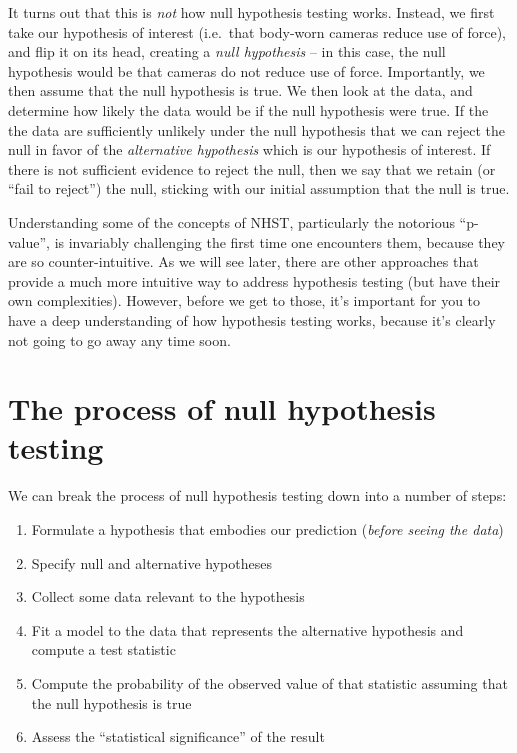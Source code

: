 \documentclass[
  12pt,
]{book}
\providecommand{\tightlist}{%
  \setlength{\itemsep}{0pt}\setlength{\parskip}{0pt}}
\begin{document}
It turns out that this is \emph{not} how null hypothesis testing works. Instead, we first take our hypothesis of interest (i.e.~that body-worn cameras reduce use of force), and flip it on its head, creating a \emph{null hypothesis} -- in this case, the null hypothesis would be that cameras do not reduce use of force. Importantly, we then assume that the null hypothesis is true. We then look at the data, and determine how likely the data would be if the null hypothesis were true. If the the data are sufficiently unlikely under the null hypothesis that we can reject the null in favor of the \emph{alternative hypothesis} which is our hypothesis of interest. If there is not sufficient evidence to reject the null, then we say that we retain (or ``fail to reject'') the null, sticking with our initial assumption that the null is true.

Understanding some of the concepts of NHST, particularly the notorious ``p-value'', is invariably challenging the first time one encounters them, because they are so counter-intuitive. As we will see later, there are other approaches that provide a much more intuitive way to address hypothesis testing (but have their own complexities). However, before we get to those, it's important for you to have a deep understanding of how hypothesis testing works, because it's clearly not going to go away any time soon.

\hypertarget{the-process-of-null-hypothesis-testing}{%
\section{The process of null hypothesis testing}\label{the-process-of-null-hypothesis-testing}}

We can break the process of null hypothesis testing down into a number of steps:

\begin{enumerate}
\def\labelenumi{\arabic{enumi}.}
\tightlist
\item
  Formulate a hypothesis that embodies our prediction (\emph{before seeing the data})
\item
  Specify null and alternative hypotheses
\item
  Collect some data relevant to the hypothesis
\item
  Fit a model to the data that represents the alternative hypothesis and compute a test statistic
\item
  Compute the probability of the observed value of that statistic assuming that the null hypothesis is true
\item
  Assess the ``statistical significance'' of the result
\end{enumerate}
\end{document}
